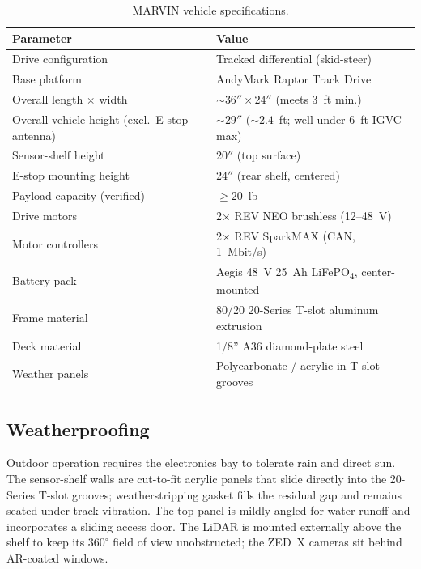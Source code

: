\documentclass[12pt, letterpaper]{article}
\newcommand{\robotname}{MARVIN}
\begin{document}
\begin{table}[H]
    \centering
    \footnotesize
    \caption{\robotname{} vehicle specifications.}
    \label{tab:specs}
    \begin{tabular}{l l}
        \toprule
        \textbf{Parameter} & \textbf{Value} \\
        \midrule
        Drive configuration & Tracked differential (skid-steer) \\
        Base platform & AndyMark Raptor Track Drive \\
        Overall length $\times$ width & $\sim 36'' \times 24''$ (meets 3~ft min.) \\
        Overall vehicle height (excl.\ E-stop antenna) & $\sim 29''$ ($\sim 2.4$~ft; well under 6~ft IGVC max) \\
        Sensor-shelf height & $20''$ (top surface) \\
        E-stop mounting height & $24''$ (rear shelf, centered) \\
        Payload capacity (verified) & $\geq 20$~lb \\
        Drive motors & 2$\times$ REV NEO brushless (12--48~V) \\
        Motor controllers & 2$\times$ REV SparkMAX (CAN, 1~Mbit/s) \\
        Battery pack & Aegis 48~V 25~Ah LiFePO\textsubscript{4}, center-mounted \\
        Frame material & 80/20 20-Series T-slot aluminum extrusion \\
        Deck material & 1/8'' A36 diamond-plate steel \\
        Weather panels & Polycarbonate / acrylic in T-slot grooves \\
        \bottomrule
    \end{tabular}
\end{table}

\subsection{Weatherproofing}

Outdoor operation requires the electronics bay to tolerate rain and direct sun. The
sensor-shelf walls are cut-to-fit acrylic panels that slide directly into the 20-Series
T-slot grooves; weatherstripping gasket fills the residual gap and remains seated under
track vibration. The top panel is mildly angled for water runoff and incorporates a
sliding access door. The LiDAR is mounted externally above the shelf to keep its
$360^\circ$ field of view unobstructed; the ZED~X cameras sit behind AR-coated windows.
\end{document}
